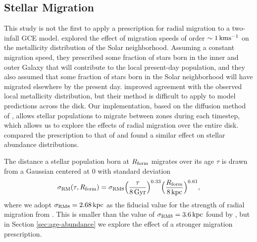 \documentclass[twocolumn,twocolappendix,linenumbers]{aastex631}
\newcommand{\kpc}{\,{\rm kpc}}
\begin{document}
\subsection{Stellar Migration}
\label{sec:migration}

This study is not the first to apply a prescription for radial migration to a two-infall GCE model. \citet{spitoni_effect_2015} explored the effect of migration speeds of order $\sim1\,{\rm km}{\rm s}^{-1}$ on the metallicity distribution of the Solar neighborhood. Assuming a constant migration speed, they prescribed some fraction of stars born in the inner and outer Galaxy that will contribute to the local present-day population, and they also assumed that some fraction of stars born in the Solar neighborhood will have migrated elsewhere by the present day. \citet{spitoni_effect_2015} improved agreement with the observed local metallicity distribution, but their method is difficult to apply to model predictions across the disk. Our implementation, based on the diffusion method of \citet{frankel_measuring_2018}, allows stellar populations to migrate between zones during each timestep, which allows us to explore the effects of radial migration over the entire disk. \citet{palla_mgfe_2022} compared the \citet{spitoni_effect_2015} prescription to that of \citet{frankel_measuring_2018} and found a similar effect on stellar abundance distributions.

The distance a stellar population born at $R_{\rm form}$ migrates over its age $\tau$ is drawn from a Gaussian centered at 0 with standard deviation
\begin{equation}
    \sigma_{\rm RM}(\tau,R_{\rm form}) = \sigma_{\rm RM8} \Big(\frac{\tau}{8\,{\rm Gyr}}\Big)^{0.33} \Big(\frac{R_{\rm form}}{8\kpc}\Big)^{0.61},
    \label{eq:radial-migration}
\end{equation}
where we adopt $\sigma_{\rm RM8}=2.68\kpc$ as the fiducial value for the strength of radial migration from \citet{dubay_galactic_2024}. This is smaller than the value of $\sigma_{\rm RM8}=3.6\kpc$ found by \citet{frankel_measuring_2018}, but in Section \ref{sec:age-abundance} we explore the effect of a stronger migration prescription.
\end{document}
